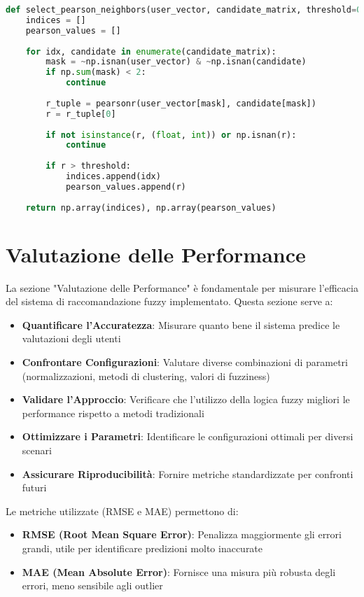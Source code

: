 \begin{lstlisting}[language=Python, caption=Selezione vicini Pearson]
def select_pearson_neighbors(user_vector, candidate_matrix, threshold=0.5):
    indices = []
    pearson_values = []
    
    for idx, candidate in enumerate(candidate_matrix):
        mask = ~np.isnan(user_vector) & ~np.isnan(candidate)
        if np.sum(mask) < 2:
            continue
        
        r_tuple = pearsonr(user_vector[mask], candidate[mask])
        r = r_tuple[0]
        
        if not isinstance(r, (float, int)) or np.isnan(r):
            continue
        
        if r > threshold:
            indices.append(idx)
            pearson_values.append(r)
    
    return np.array(indices), np.array(pearson_values)
\end{lstlisting}

\section{Valutazione delle Performance}

La sezione "Valutazione delle Performance" è fondamentale per misurare l'efficacia del sistema di raccomandazione fuzzy implementato. Questa sezione serve a:

\begin{itemize}
    \item \textbf{Quantificare l'Accuratezza}: Misurare quanto bene il sistema predice le valutazioni degli utenti
    \item \textbf{Confrontare Configurazioni}: Valutare diverse combinazioni di parametri (normalizzazioni, metodi di clustering, valori di fuzziness)
    \item \textbf{Validare l'Approccio}: Verificare che l'utilizzo della logica fuzzy migliori le performance rispetto a metodi tradizionali
    \item \textbf{Ottimizzare i Parametri}: Identificare le configurazioni ottimali per diversi scenari
    \item \textbf{Assicurare Riproducibilità}: Fornire metriche standardizzate per confronti futuri
\end{itemize}

Le metriche utilizzate (RMSE e MAE) permettono di:
\begin{itemize}
    \item \textbf{RMSE (Root Mean Square Error)}: Penalizza maggiormente gli errori grandi, utile per identificare predizioni molto inaccurate
    \item \textbf{MAE (Mean Absolute Error)}: Fornisce una misura più robusta degli errori, meno sensibile agli outlier
\end{itemize}

